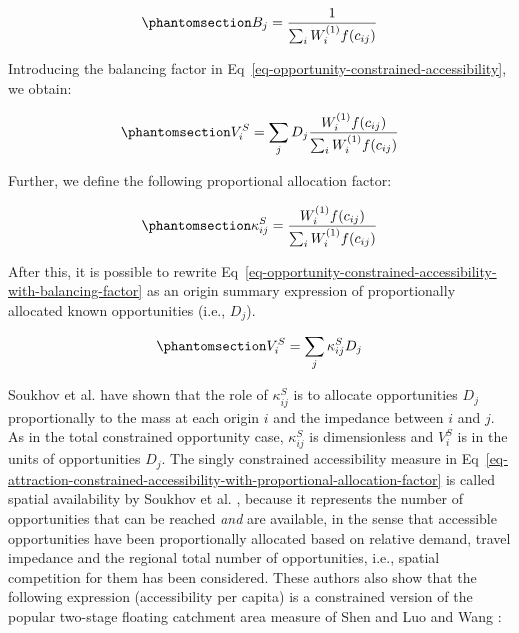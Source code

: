 \documentclass[
  10pt,
  letterpaper,
]{article}
\begin{document}
\begin{equation}\phantomsection\label{eq-opportunity-constrained-proportionality-constants}{
B_j = \frac{1}{\sum_i W_i^{(1)} f(c_{ij})}
}\end{equation}

Introducing the balancing factor in
Eq~\ref{eq-opportunity-constrained-accessibility}, we obtain:

\begin{equation}\phantomsection\label{eq-opportunity-constrained-accessibility-with-balancing-factor}{
V^S_{i} = \sum_j D_j \frac{W_i^{(1)} f(c_{ij})}{\sum_i W_i^{(1)} f(c_{ij})}
}\end{equation}

Further, we define the following proportional allocation factor:

\begin{equation}\phantomsection\label{eq-opportunity-constrained-proportional-allocation-factor}{
\kappa^S_{ij} = \frac{W_i^{(1)} f(c_{ij})}{\sum_i W_i^{(1)} f(c_{ij})}
}\end{equation}

After this, it is possible to rewrite
Eq~\ref{eq-opportunity-constrained-accessibility-with-balancing-factor}
as an origin summary expression of proportionally allocated known
opportunities (i.e., \(D_j\)).

\begin{equation}\phantomsection\label{eq-attraction-constrained-accessibility-with-proportional-allocation-factor}{
V^S_{i} = \sum_j \kappa^S_{ij} D_j
}\end{equation}

Soukhov et al. \citep{soukhovIntroducingSpatialAvailability2023} have
shown that the role of \(\kappa^S_{ij}\) is to allocate opportunities
\(D_j\) proportionally to the mass at each origin \(i\) and the
impedance between \(i\) and \(j\). As in the total constrained
opportunity case, \(\kappa^S_{ij}\) is dimensionless and \(V_i^S\) is in
the units of opportunities \(D_j\). The singly constrained accessibility
measure in
Eq~\ref{eq-attraction-constrained-accessibility-with-proportional-allocation-factor}
is called spatial availability by Soukhov et al.
\citep{soukhovIntroducingSpatialAvailability2023}, because it represents
the number of opportunities that can be reached \emph{and} are
available, in the sense that accessible opportunities have been
proportionally allocated based on relative demand, travel impedance and
the regional total number of opportunities, i.e., spatial competition
for them has been considered. These authors also show that the following
expression (accessibility per capita) is a constrained version of the
popular two-stage floating catchment area measure of Shen
\citep{shen1998} and Luo and Wang \citep{luo2003}:
\end{document}
